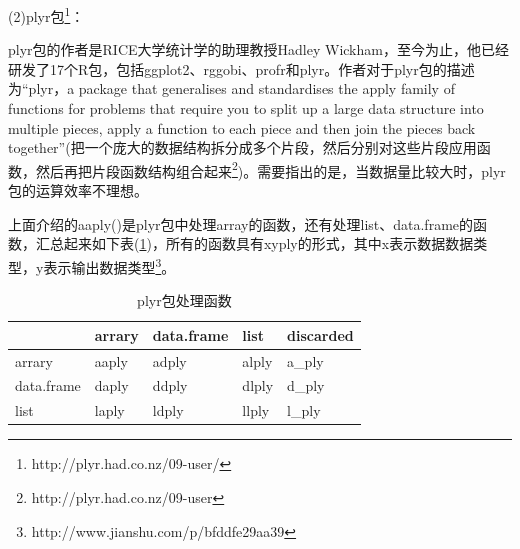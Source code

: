             (2)plyr包\footnote{http://plyr.had.co.nz/09-user/}：
            \par
            plyr包的作者是RICE大学统计学的助理教授Hadley Wickham，至今为止，他已经研发了17个R包，包括ggplot2、rggobi、profr和plyr。作者对于plyr包的描述为“plyr，a package that generalises and standardises the apply family of functions for problems that require you to split up a large data structure into multiple pieces, apply a function to each piece and then join the pieces back together”(把一个庞大的数据结构拆分成多个片段，然后分别对这些片段应用函数，然后再把片段函数结构组合起来\footnote{http://plyr.had.co.nz/09-user})。需要指出的是，当数据量比较大时，plyr包的运算效率不理想。
            \par
            上面介绍的aaply()是plyr包中处理array的函数，还有处理list、data.frame的函数，汇总起来如下表(\ref{tab:plyr包处理函数})，所有的函数具有xyply的形式，其中x表示数据数据类型，y表示输出数据类型\footnote{http://www.jianshu.com/p/bfddfe29aa39 }。
              \begin{table}[H]
              \caption{plyr包处理函数}
              \label{tab:plyr包处理函数}
                  \centering
                \begin{tabular}{lllll}
                  \toprule
                \rowcolor{lightgray}{}&arrary & data.frame & list & discarded\\
                  \midrule
                \cellcolor{lightgray}arrary & aaply & adply & alply & a\_ply\\
                \cellcolor{lightgray}data.frame & daply &ddply &dlply &d\_ply\\
                \cellcolor{lightgray}list & laply &ldply& llply& l\_ply\\
                  \bottomrule
                \end{tabular}
              \end{table}
